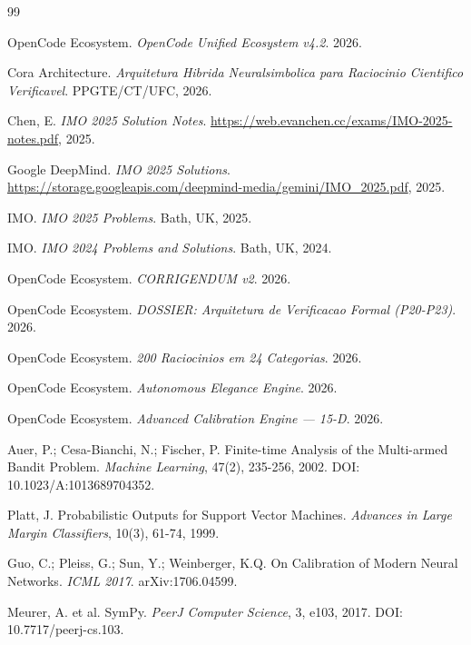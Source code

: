\documentclass[5p]{elsarticle}
\begin{document}
\begin{thebibliography}{99}

OpenCode Ecosystem. \textit{OpenCode Unified Ecosystem v4.2}. 2026.

Cora Architecture. \textit{Arquitetura Hibrida Neuralsimbolica para Raciocinio Cientifico Verificavel}. PPGTE/CT/UFC, 2026.

Chen, E. \textit{IMO 2025 Solution Notes}. \url{https://web.evanchen.cc/exams/IMO-2025-notes.pdf}, 2025.

Google DeepMind. \textit{IMO 2025 Solutions}. \url{https://storage.googleapis.com/deepmind-media/gemini/IMO_2025.pdf}, 2025.

IMO. \textit{IMO 2025 Problems}. Bath, UK, 2025.

IMO. \textit{IMO 2024 Problems and Solutions}. Bath, UK, 2024.

OpenCode Ecosystem. \textit{CORRIGENDUM v2}. 2026.

OpenCode Ecosystem. \textit{DOSSIER: Arquitetura de Verificacao Formal (P20-P23)}. 2026.

OpenCode Ecosystem. \textit{200 Raciocinios em 24 Categorias}. 2026.

OpenCode Ecosystem. \textit{Autonomous Elegance Engine}. 2026.

OpenCode Ecosystem. \textit{Advanced Calibration Engine — 15-D}. 2026.

Auer, P.; Cesa-Bianchi, N.; Fischer, P. Finite-time Analysis of the Multi-armed Bandit Problem. \textit{Machine Learning}, 47(2), 235-256, 2002. DOI: 10.1023/A:1013689704352.

Platt, J. Probabilistic Outputs for Support Vector Machines. \textit{Advances in Large Margin Classifiers}, 10(3), 61-74, 1999.

Guo, C.; Pleiss, G.; Sun, Y.; Weinberger, K.Q. On Calibration of Modern Neural Networks. \textit{ICML 2017}. arXiv:1706.04599.

Meurer, A. et al. SymPy. \textit{PeerJ Computer Science}, 3, e103, 2017. DOI: 10.7717/peerj-cs.103.


\end{thebibliography}
\end{document}
